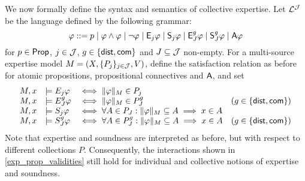 We now formally define the syntax and semantics of collective expertise. Let
$\mathcal{L}^{\mathcal{J}}$ be the language defined by the following grammar:
\[
\varphi ::=
p \mid
\varphi \land \varphi \mid
\neg\varphi \mid
\mathsf{E}_j\varphi \mid \mathsf{S}_j\varphi \mid
\mathsf{E}_J^g\varphi \mid \mathsf{S}_J^g\varphi \mid
\mathsf{A}\varphi\]
for $p \in \mathsf{Prop}$, $j \in \mathcal{J}$, $g \in \{\mathsf{dist}, \mathsf{com}\}$ and
$J \subseteq \mathcal{J}$ non-empty. For a multi-source expertise model $M =
(X, \{P_j\}_{j \in \mathcal{J}}, V)$, define the satisfaction relation as before for
atomic propositions, propositional connectives and
$\mathsf{A}$, and set
\[
\begin{array}{lllr}
 M, x &\models E_j\varphi &\iff \|\varphi\|_M \in P_j \\
 M, x &\models E_J^g\varphi &\iff \|\varphi\|_M \in P_J^g
     & (g \in \{\mathsf{dist}, \mathsf{com}\}) \\
 M, x &\models S_j\varphi &\iff \forall A \in P_J: \|\varphi\|_M \subseteq A
     \implies x \in A \\
 M, x &\models S_J^g\varphi &\iff \forall A \in P_J^g: \|\varphi\|_M \subseteq A
     \implies x \in A
     & (g \in \{\mathsf{dist}, \mathsf{com}\})
\end{array}\]
Note that expertise and soundness are interpreted as before, but with respect
to different collections $P$. Consequently, the interactions
shown in \cref{exp_prop_validities} still hold for individual and collective
notions of expertise and soundness.


